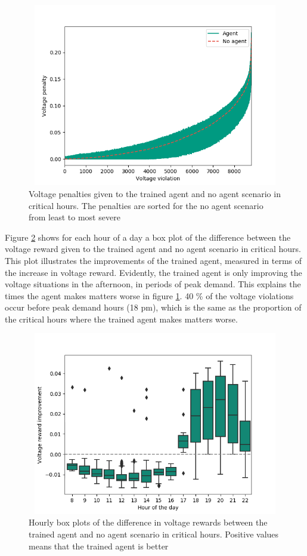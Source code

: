 \documentclass[class=book, crop=false, 11pt]{standalone}
\begin{document}
\begin{figure}[h]
    \center
\includegraphics[height=8cm, width=12cm]{figures/config1_sorted_voltage.png}
    \caption {Voltage penalties given to the trained agent and no agent scenario in critical hours. The penalties are sorted for the no agent scenario from least to most severe}
    \label{fig:results:config1_sorted_voltage}
\end{figure}


Figure \ref{fig:results:config1_improvement_voltage} shows for each hour of a day a box plot of the difference between the voltage reward given to the trained agent and no agent scenario in critical hours. This plot illustrates the improvements of the trained agent, measured in terms of the increase in voltage reward. Evidently, the trained agent is only improving the voltage situations in the afternoon, in periods of peak demand. This explains the times the agent makes matters worse in figure \ref{fig:results:config1_sorted_voltage}. 40 \% of the voltage violations occur before peak demand hours (18 pm), which is the same as the proportion of the critical hours where the trained agent makes matters worse. 

\begin{figure}[h]
    \center
\includegraphics[height=8cm, width=12cm]{figures/config1_improvement_voltage.png}
    \caption {Hourly box plots of the difference in voltage rewards between the trained agent and no agent scenario in critical hours. Positive values means that the trained agent is better}
    \label{fig:results:config1_improvement_voltage}
\end{figure}
\end{document}
